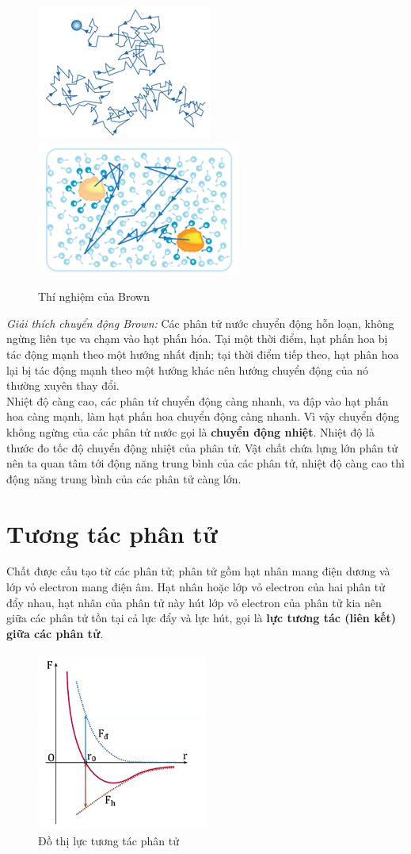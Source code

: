 \documentclass[a4paper, 12pt]{article}
\begin{document}
\begin{figure}[H]
	\centering
	\includegraphics[width=0.2\linewidth]{img/Picture2.png}
	\includegraphics[width=0.2\linewidth]{img/Picture3.png}
	\caption{Thí nghiệm của Brown}
\end{figure}

\textit{Giải thích chuyển động Brown:} Các phân tử nước chuyển động hỗn loạn, không ngừng liên tục va chạm vào hạt phấn hóa. Tại một thời điểm, hạt phấn hoa bị tác động mạnh theo một hướng nhất định; tại thời điểm tiếp theo, hạt phân hoa lại bị tác động mạnh theo một hướng khác nên hướng chuyển động của nó thường xuyên thay đổi.\\

Nhiệt độ càng cao, các phân tử chuyển động càng nhanh, va đập vào hạt phấn hoa càng mạnh, làm hạt phấn hoa chuyển động càng nhanh. Vì vậy chuyển động không ngừng của các phân tử nước gọi là \textbf{chuyển động nhiệt}. Nhiệt độ là thước đo tốc độ chuyển động nhiệt của phân tử. Vật chất chứa lựng lớn phân tử nên ta quan tâm tới động năng trung bình của các phân tử, nhiệt độ càng cao thì động năng trung bình của các phân tử càng lớn.

\section{Tương tác phân tử}

Chất được cấu tạo từ các phân tử; phân tử gồm hạt nhân mang điện dương và lớp vỏ electron mang điện âm. Hạt nhân hoặc lớp vỏ electron của hai phân tử đẩy nhau, hạt nhân của phân tử này hút lớp vỏ electron của phân tử kia nên giữa các phân tử tồn tại cả lực đẩy và lực hút, gọi là \textbf{lực tương tác (liên kết) giữa các phân tử}.\\ 

\begin{figure}[H]
	\centering
	\includegraphics[width=0.35\linewidth]{img/Picture4.png}
	\caption{Đồ thị lực tương tác phân tử}
\end{figure}
\end{document}
